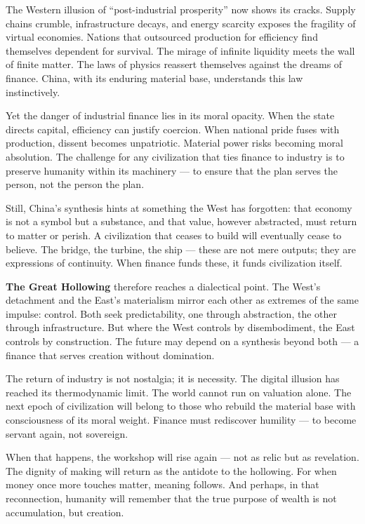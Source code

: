 \documentclass[11pt,twoside]{book}
\begin{document}
The Western illusion of “post-industrial prosperity” now shows its cracks.  Supply chains crumble, infrastructure decays, and energy scarcity exposes the fragility of virtual economies.  Nations that outsourced production for efficiency find themselves dependent for survival.  The mirage of infinite liquidity meets the wall of finite matter.  The laws of physics reassert themselves against the dreams of finance.  China, with its enduring material base, understands this law instinctively.

Yet the danger of industrial finance lies in its moral opacity.  When the state directs capital, efficiency can justify coercion.  When national pride fuses with production, dissent becomes unpatriotic.  Material power risks becoming moral absolution.  The challenge for any civilization that ties finance to industry is to preserve humanity within its machinery — to ensure that the plan serves the person, not the person the plan.

Still, China’s synthesis hints at something the West has forgotten: that economy is not a symbol but a substance, and that value, however abstracted, must return to matter or perish.  A civilization that ceases to build will eventually cease to believe.  The bridge, the turbine, the ship — these are not mere outputs; they are expressions of continuity.  When finance funds these, it funds civilization itself.

\textbf{The Great Hollowing} therefore reaches a dialectical point.  The West’s detachment and the East’s materialism mirror each other as extremes of the same impulse: control.  Both seek predictability, one through abstraction, the other through infrastructure.  But where the West controls by disembodiment, the East controls by construction.  The future may depend on a synthesis beyond both — a finance that serves creation without domination.

The return of industry is not nostalgia; it is necessity.  The digital illusion has reached its thermodynamic limit.  The world cannot run on valuation alone.  The next epoch of civilization will belong to those who rebuild the material base with consciousness of its moral weight.  Finance must rediscover humility — to become servant again, not sovereign.

When that happens, the workshop will rise again — not as relic but as revelation.  The dignity of making will return as the antidote to the hollowing.  For when money once more touches matter, meaning follows.  And perhaps, in that reconnection, humanity will remember that the true purpose of wealth is not accumulation, but creation.
\end{document}
